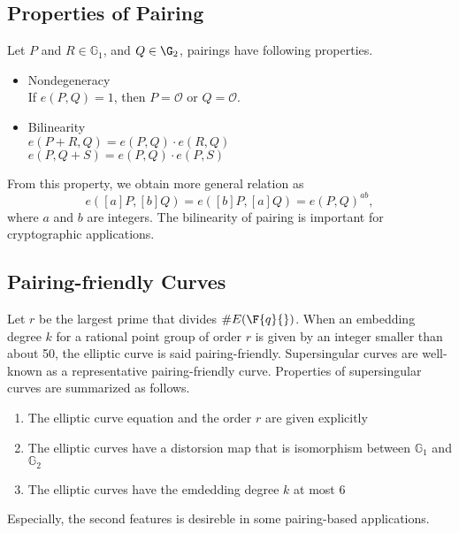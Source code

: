 \subsection{Properties of Pairing}

Let $P$ and $R \in \mathbb{G}_1$, and $Q \in \G_2$, pairings have following properties.

\begin{itemize}
\item Nondegeneracy \\
If $e(P,Q)=1$, then $P=\mathcal{O}$ or $Q=\mathcal{O}$.\\
\item Bilinearity\\
$e(P+R,Q)=e(P,Q)\cdot e(R,Q)$\\
$e(P,Q+S)=e(P,Q)\cdot e(P,S)$\\
\end{itemize}
From this property, we obtain more general relation as 
\begin{equation}
e\left([a]P,[b]Q\right)=e\left([b]P,[a]Q\right)=e(P,Q)^{ab}, 
\end{equation}
where $a$ and $b$ are integers.
The bilinearity of pairing is important for cryptographic applications.

\subsection{Pairing-friendly Curves}\label{sec:pfc}
Let $r$ be the largest prime that divides $\#E(\F{q}{})$.
When an embedding degree $k$ for a rational point group of order $r$ is given by an integer smaller than about 50, the elliptic curve is said pairing-friendly.
Supersingular curves are well-known as a representative pairing-friendly curve.
Properties of supersingular curves are summarized as follows.
\begin{enumerate}
\item The elliptic curve equation and the order $r$ are given explicitly
\item The elliptic curves have a distorsion map that is isomorphism between $\mathbb{G}_1$ and $\mathbb{G}_2$ \cite{Handbook} 
\item The elliptic curves have the emdedding degree $k$ at most 6 
\end{enumerate}
Especially, the second features is desireble in some pairing-based applications.

